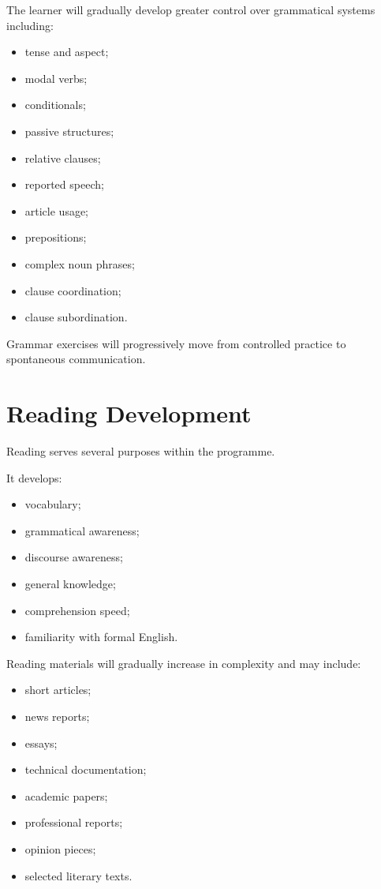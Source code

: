 The learner will gradually develop greater control over grammatical systems including:

\begin{itemize}
    \item tense and aspect;
    \item modal verbs;
    \item conditionals;
    \item passive structures;
    \item relative clauses;
    \item reported speech;
    \item article usage;
    \item prepositions;
    \item complex noun phrases;
    \item clause coordination;
    \item clause subordination.
\end{itemize}

Grammar exercises will progressively move from controlled practice to spontaneous communication.

\section*{Reading Development}

Reading serves several purposes within the programme.

It develops:

\begin{itemize}
    \item vocabulary;
    \item grammatical awareness;
    \item discourse awareness;
    \item general knowledge;
    \item comprehension speed;
    \item familiarity with formal English.
\end{itemize}

Reading materials will gradually increase in complexity and may include:

\begin{itemize}
    \item short articles;
    \item news reports;
    \item essays;
    \item technical documentation;
    \item academic papers;
    \item professional reports;
    \item opinion pieces;
    \item selected literary texts.
\end{itemize}

